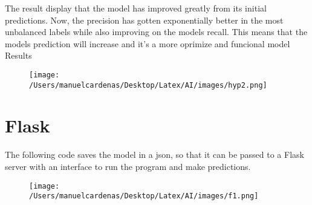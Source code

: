 \documentclass{article}
\begin{document}
     The result display that the model has improved greatly from  its initial predictions.
      Now, the precision has gotten exponentially better in the most unbalanced labels while also improving on the models recall. 
      This means that the models prediction will increase and it's a more oprimize and funcional model\pagebreak
      Results
     \begin{figure}[h]
         \centering
         \texttt{[image: /Users/manuelcardenas/Desktop/Latex/AI/images/hyp2.png]}
         \label{fig:hp2}
     \end{figure}


\section{Flask}
     The following code saves the model in a json, so that it can be passed to a Flask 
     server with an interface to run the program and make predictions.
     \begin{figure}[h]
         \centering
         \texttt{[image: /Users/manuelcardenas/Desktop/Latex/AI/images/f1.png]}
         \label{fig:f1}
     \end{figure}



\end{document}
